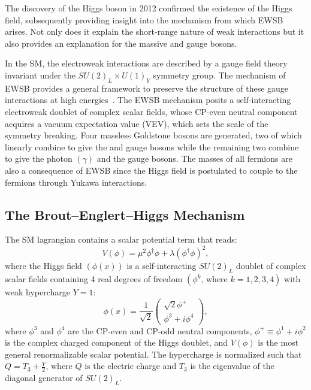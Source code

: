 The discovery of the Higgs boson in 2012 confirmed the existence of the Higgs field, subsequently providing insight into the mechanism from which EWSB arises.
Not only does it explain the short-range nature of weak interactions but it also provides an explanation for the massive \PWpm and \PZ gauge bosons.

In the SM, the electroweak interactions are described by a gauge field theory invariant under the $SU(2)_L \times U(1)_Y$ symmetry group.
The mechanism of EWSB provides a general framework to preserve the structure of these gauge interactions at high energies~\cite{PhysRevD.2.1285, PhysRevLett.13.321, PhysRev.145.1156}.
The EWSB mechanism posits a self-interacting electroweak doublet of complex scalar fields, whose CP-even neutral component acquires a vacuum expectation value (VEV), which sets the scale of the symmetry breaking.
Four massless Goldstone bosons are generated, two of which linearly combine to give the \PWp and \PWm gauge bosons while the remaining two combine to give the photon $(\gamma)$ and the \PZ gauge bosons.
The masses of all fermions are also a consequence of EWSB since the Higgs field is postulated to couple to the fermions through Yukawa interactions.

\subsection{The Brout--Englert--Higgs Mechanism}
\label{sec:higgs_mech}

The SM lagrangian contains a scalar potential term that reads:
\begin{equation}
    V (\phi) = \mu^2\phi^\dagger\phi + \lambda(\phi^\dagger\phi)^2,
    \label{eqn:scalar_pot}
\end{equation}
where the Higgs field $\left( \phi(x) \right)$ is a self-interacting $SU(2)_L$ doublet of complex scalar fields containing 4 real degrees of freedom $\left( \phi^k \text{, where } k=1, 2, 3, 4 \right)$ with weak hypercharge $Y = 1$:
\begin{equation}
    \phi(x) = \frac{1}{\sqrt{2}}
    \begin{pmatrix}
        \sqrt{2}\phi^+ \\
        \phi^3 + i\phi^4
    \end{pmatrix},
    \label{eqn:higgs_doublet}
\end{equation}
where $\phi^3$ and $\phi^4$ are the CP-even and CP-odd neutral components, $\phi^+ \equiv \phi^1 + i \phi^2$ is the complex charged component of the Higgs doublet, and $V(\phi)$ is the most general renormalizable scalar potential.
The hypercharge is normalized such that $Q = T_{3} + \frac{Y}{2}$, where $Q$ is the electric charge and $T_{3}$ is the eigenvalue of the diagonal generator of $SU(2)_L$.

